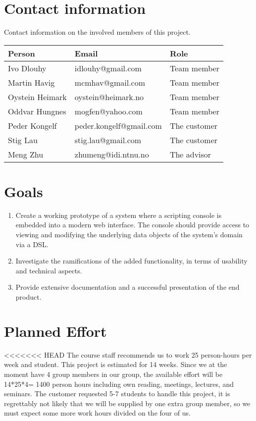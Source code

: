 \section{Contact information}
Contact information on the involved members of this project.
\begin{table}
    \begin{tabular}{ | l | l | l | }
      \hline
      \textbf{Person} & \textbf{Email} & \textbf{Role} \\ \hline
      Ivo Dlouhy & idlouhy@gmail.com & Team member \\ \hline
      Martin Havig & mcmhav@gmail.com & Team member \\ \hline
      Oystein Heimark & oystein@heimark.no & Team member \\ \hline
      Oddvar Hungnes & mogfen@yahoo.com & Team member \\ \hline
      Peder Kongelf & peder.kongelf@gmail.com & The customer \\ \hline
      Stig Lau & stig.lau@gmail.com & The customer \\ \hline
      Meng Zhu & zhumeng@idi.ntnu.no & The advisor \\ \hline
    \end{tabular}
\end{table}

\section{Goals}
\begin{enumerate}
  \item Create a working prototype of a system where a scripting console is embedded into a modern web interface. The console should provide access to viewing and modifying the underlying data objects of the system's domain via a DSL.
  \item Investigate the ramifications of the added functionality, in terms of usability and technical aspects.
  \item Provide extensive documentation and a successful presentation of the end product.
\end{enumerate}

\section{Planned Effort}
<<<<<<< HEAD
The course staff recommends us to work 25 person-hours per week and student. This project is estimated for 14 weeks. Since we at the moment have 4 group members in our group, the available effort will be 14*25*4= 1400 person hours including own reading, meetings, lectures, and seminars. The customer requested 5-7 students to handle this project, it is regrettably not likely that we will be supplied by one extra group member, so we must expect some more work hours divided on the four of us.

